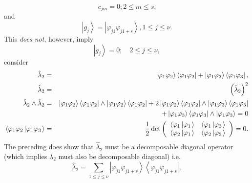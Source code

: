 \documentclass[12pt]{article}
\begin{document}
\begin{equation}
c_{jm}=0;2\leq m\leq s.
\end{equation}%
and 
\begin{equation}
\left\vert g_{j}\right\rangle =\left\vert \varphi _{j1}\varphi
_{j1+s}\right\rangle ,1\leq j\leq \nu .
\end{equation}%
This \emph{does not}, however, imply 
\begin{equation}
\left\vert g_{j}\right\rangle =0;\quad 2\leq j\leq \nu ,
\end{equation}%
consider 
\begin{eqnarray}
\hat{\lambda}_{2} &=&\left\vert \varphi _{1}\varphi _{2}\right\rangle
\left\langle \varphi _{1}\varphi _{2}\right\vert +\left\vert \varphi
_{1}\varphi _{3}\right\rangle \left\langle \varphi _{1}\varphi
_{3}\right\vert ,  \notag \\
\hat{\lambda}_{2} &=&\left( \hat{\lambda}_{2}\right) ^{2}  \notag \\
\hat{\lambda}_{2}\wedge \hat{\lambda}_{2} &=&\left\vert \varphi _{1}\varphi
_{2}\right\rangle \left\langle \varphi _{1}\varphi _{2}\right\vert \wedge
\left\vert \varphi _{1}\varphi _{2}\right\rangle \left\langle \varphi
_{1}\varphi _{2}\right\vert +2\left\vert \varphi _{1}\varphi
_{2}\right\rangle \left\langle \varphi _{1}\varphi _{2}\right\vert \wedge
\left\vert \varphi _{1}\varphi _{3}\right\rangle \left\langle \varphi
_{1}\varphi _{3}\right\vert   \notag \\
&&+\left\vert \varphi _{1}\varphi _{3}\right\rangle \left\langle \varphi
_{1}\varphi _{3}\right\vert \wedge \left\vert \varphi _{1}\varphi
_{3}\right\rangle \left. =\right. 0  \notag \\
\left\langle \varphi _{1}\varphi _{2}\left\vert \varphi _{1}\varphi
_{3}\right. \right\rangle  &=&\frac{1}{2}\det \left( 
\begin{array}{cc}
\left\langle \varphi _{1}\left\vert \varphi _{1}\right. \right\rangle  & 
\left\langle \varphi _{1}\left\vert \varphi _{3}\right. \right\rangle  \\ 
\left\langle \varphi _{2}\left\vert \varphi _{1}\right. \right\rangle  & 
\left\langle \varphi _{2}\left\vert \varphi _{3}\right. \right\rangle 
\end{array}%
\right) =0.
\end{eqnarray}%
The preceding does show that $\hat{\lambda}_{2}$ must be a decomposable
diagonal operator (which implies $\lambda _{2}$ must also be decomposable
diagonal) i.e. 
\begin{equation}
\hat{\lambda}_{2}=\sum_{1\leq j\leq \nu }\left\vert \varphi _{j1}\varphi
_{j1+s}\right\rangle \left\langle \varphi _{j1}\varphi _{j1+s}\right\vert ,
\end{equation}%
\end{document}
